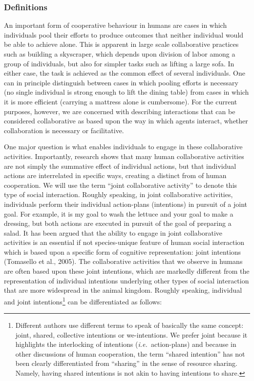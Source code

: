 \documentclass{article}
\newcommand{\ie}{{\textit{i.e.~}}}
\begin{document}
\subsubsection{Definitions}

An important form of cooperative behaviour in humans are cases in which
individuals pool their efforts to produce outcomes that neither individual
would be able to achieve alone. This is apparent in large scale collaborative
practices such as building a skyscraper, which depends upon division of labor
among a group of individuals, but also for simpler tasks such as lifting a
large sofa. In either case, the task is achieved as the common effect of
several individuals. One can in principle distinguish between cases in which
pooling efforts is necessary (no single individual is strong enough to lift the
dining table) from cases in which it is more efficient (carrying a mattress
alone is cumbersome). For the current purposes, however, we are concerned with
describing interactions that can be considered collaborative as based upon the
way in which agents interact, whether collaboration is necessary or
facilitative.

One major question is what enables individuals to engage in these collaborative
activities. Importantly, research shows that many human collaborative
activities are not simply the summative effect of individual actions, but that
individual actions are interrelated in specific ways, creating a distinct from
of human cooperation. We will use the term ``joint collaborative activity''
to denote this type of social interaction. Roughly speaking, in joint
collaborative activities, individuals perform their individual action-plans
(intentions) in pursuit of a joint goal. For example, it is my goal to wash the
lettuce and your goal to make a dressing, but both actions are executed in
pursuit of the goal of preparing a salad. It has been argued that the ability
to engage in joint collaborative activities is an essential if not
species-unique feature of human social interaction which is based upon a
specific form of cognitive representation: joint intentions (Tomasello et al.,
2005). The collaborative activities that we observe in humans are often based
upon these joint intentions, which are markedly different from the
representation of individual intentions underlying other types of social
interaction that are more widespread in the animal kingdom. Roughly speaking,
individual and joint intentions\footnote{ Different authors use different terms
to speak of basically the same concept: joint, shared, collective intentions or
we-intentions. We prefer joint because it highlights the interlocking of
intentions (\ie action-plans) and because in other discussions of human
cooperation, the term ``shared intention'' has not been clearly differentiated
from ``sharing'' in the sense of resource sharing. Namely, having shared
intentions is not akin to having intentions to share.\par } can be
differentiated as follows:
\end{document}
